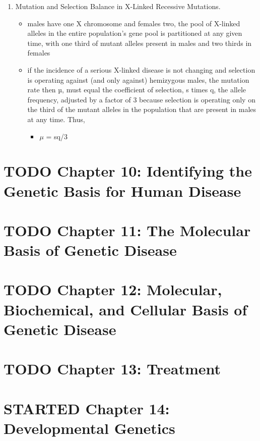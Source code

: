 \documentclass{scrartcl}
\begin{document}
\begin{enumerate}
\item Mutation and Selection Balance in X-Linked Recessive Mutations.
\label{sec:org5aa1440}
\begin{itemize}
\item males have one X chromosome and females two, the pool of X-linked
alleles in the entire population’s gene pool is partitioned at any
given time, with one third of mutant alleles present in males and
two thirds in females
\item if the incidence of a serious X-linked disease is not changing and
selection is operating against (and only against) hemizygous males,
the mutation rate then µ, must equal the coefficient of selection, s
times q, the allele frequency, adjusted by a factor of 3 because
selection is operating only on the third of the mutant alleles in
the population that are present in males at any time. Thus,
\begin{itemize}
\item \(\mu\) = sq/3
\end{itemize}
\end{itemize}
\end{enumerate}


\section{{\bfseries\sffamily TODO} Chapter 10: Identifying the Genetic Basis for Human Disease}
\label{sec:org95fe435}
\section{{\bfseries\sffamily TODO} Chapter 11: The Molecular Basis of Genetic Disease}
\label{sec:org7dd6b6c}
\section{{\bfseries\sffamily TODO} Chapter 12: Molecular, Biochemical, and Cellular Basis of Genetic Disease}
\label{sec:org7eb1096}
\section{{\bfseries\sffamily TODO} Chapter 13: Treatment}
\label{sec:org234b1f8}
\section{{\bfseries\sffamily STARTED} Chapter 14: Developmental Genetics}
\label{sec:org0e08b10}
\end{document}
